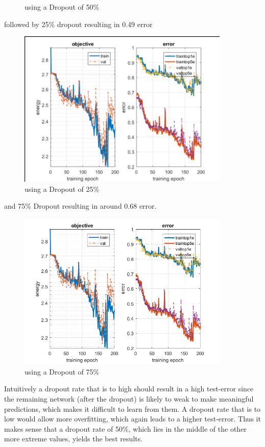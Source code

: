 \documentclass[12pt]{article}
\begin{document}
\begin{enumerate}[a)]
\begin{figure}[H]
                \caption{using a Dropout of 50\%}
        \end{figure}
        followed by 25\% dropout resulting in 0.49 error 
        \begin{figure}[H]
            \centering
                \includegraphics[width=0.9\textwidth]{Plots/3_25_200_2.png}
                \caption{using a Dropout of 25\%}
        \end{figure}
        and 75\% Dropout resulting in around 0.68 error.
        \begin{figure}[H]
            \centering
                \includegraphics[width=0.9\textwidth]{Plots/3_75_200.png}
                \caption{using a Dropout of 75\%}
        \end{figure}
        Intuitively a dropout rate that is to high should result in a high test-error since the remaining network (after the dropout) is likely to weak to make meaningful predictions, which makes it difficult to learn from them. A dropout rate that is to low would allow more overfitting, which again leads to a higher test-error. Thus it makes sense that a dropout rate of 50\%, which lies in the middle of the other more extreme values, yields the best results.
\end{enumerate}
\end{document}
